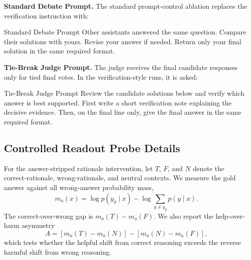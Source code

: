 \textbf{Standard Debate Prompt.}
\label{app:prompt_standard_debate}
The standard prompt-control ablation replaces the verification instruction with:
\begin{promptbox}{Standard Debate Prompt}
\small
Other assistants answered the same question. Compare their solutions with
yours. Revise your answer if needed. Return only your final solution in the same
required format.
\end{promptbox}

\textbf{Tie-Break Judge Prompt.}
\label{app:prompt_tiebreak_judge}
The judge receives the final candidate responses only for tied final votes. In
the verification-style runs, it is asked:
\begin{promptbox}{Tie-Break Judge Prompt}
\small
Review the candidate solutions below and verify which answer is best
supported. First write a short verification note explaining the decisive
evidence. Then, on the final line only, give the final answer in the same
required format.
\end{promptbox}

\clearpage
\subsection{Controlled Readout Probe Details}
\label{app:controlled_readout_probes}
For the answer-stripped rationale intervention, let $T$, $F$, and $N$ denote
the correct-rationale, wrong-rationale, and neutral contexts. We measure the
gold answer against all wrong-answer probability mass,
\[
m_a(x)=\log p(y_g\mid x)-\log\sum_{y\ne y_g}p(y\mid x).
\]
The correct-over-wrong gap is $m_a(T)-m_a(F)$. We also report the
help-over-harm asymmetry
\[
A=[m_a(T)-m_a(N)]-[m_a(N)-m_a(F)],
\]
which tests whether the helpful shift from correct reasoning exceeds the
reverse harmful shift from wrong reasoning.

\begin{table}[H]
\centering
\caption{Original peer-response effects and equivalent conclusion-only support
over recovery cases. Trace effects are means with 95\% confidence intervals;
$\widehat W$ is the median interpolated equivalent support. The final column
reports the correct-support minus wrong-support answer margin under the Verify
prompt at each dose.}
\label{tab:lvd_equivalent_support_full}
\small
{}
\end{table}

